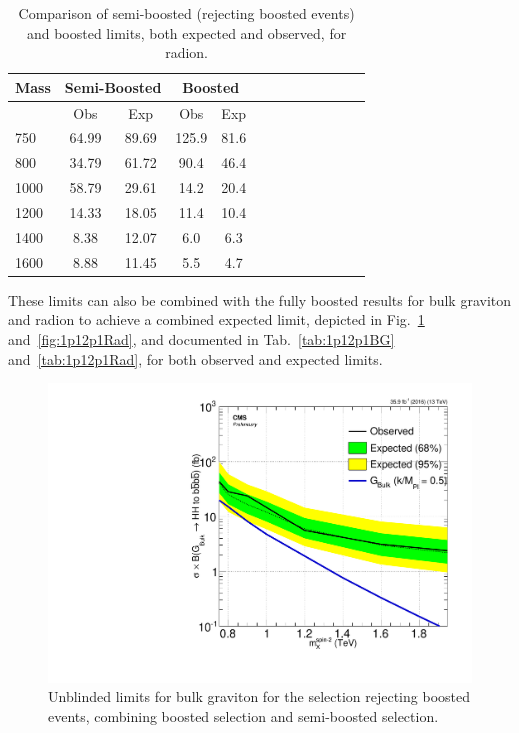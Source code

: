 \begin{table}[h]
\begin{tabular}{|l|c|c|c|c|c|c|c|c|c|c|c|c|}
\hline
Mass & \multicolumn{2}{c}{Semi-Boosted} & \multicolumn{2}{c}{Boosted}\\ \hline \hline
& Obs & Exp & Obs & Exp\\ \hline
750 & 64.99 & 89.69 & 125.9 & 81.6 \\
800 & 34.79 & 61.72 & 90.4 & 46.4 \\
1000 & 58.79 & 29.61 & 14.2 & 20.4 \\
1200 & 14.33 & 18.05 & 11.4 & 10.4 \\
1400 & 8.38 & 12.07 & 6.0 & 6.3 \\
1600 & 8.88 & 11.45 & 5.5 & 4.7 \\
\hline
\end{tabular}
\caption{Comparison of semi-boosted (rejecting boosted events) and boosted limits, both expected and observed, for radion.}
\label{tab:boostcompareRad}
\end{table}


These limits can also be combined with the fully boosted results for bulk graviton and radion to achieve a combined expected limit, depicted in Fig.~\ref{fig:1p12p1BG} and~\ref{fig:1p12p1Rad}, and documented in Tab.~\ref{tab:1p12p1BG} and~\ref{tab:1p12p1Rad}, for both observed and expected limits.

\begin{figure}[thb!]
\begin{center}
\includegraphics[scale=0.5]{F5/brazilianFlag_2p1BG1p1_HH4b2p1_HH4b2p1_13TeV.pdf}
\end{center}
\caption{Unblinded limits for bulk graviton for the selection rejecting boosted events, combining boosted selection and semi-boosted selection.}
\label{fig:1p12p1BG}
\end{figure} 

